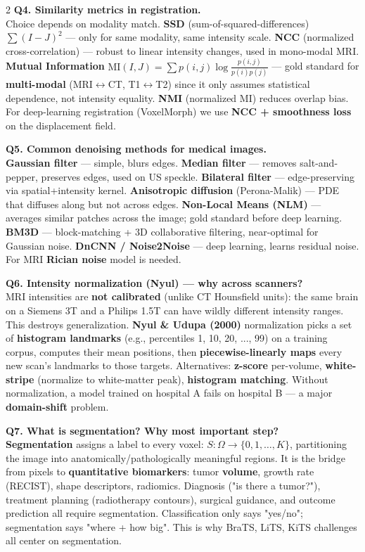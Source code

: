 \begin{paracol}{2}
\textbf{Q4. Similarity metrics in registration.}\\
Choice depends on modality match. \textbf{SSD} (sum-of-squared-differences) $\sum (I-J)^2$ — only for same modality, same intensity scale. \textbf{NCC} (normalized cross-correlation) — robust to linear intensity changes, used in mono-modal MRI. \textbf{Mutual Information} \(\mathrm{MI}(I,J)=\sum p(i,j)\log\frac{p(i,j)}{p(i)p(j)}\) — gold standard for \textbf{multi-modal} (MRI$\leftrightarrow$CT, T1$\leftrightarrow$T2) since it only assumes statistical dependence, not intensity equality. \textbf{NMI} (normalized MI) reduces overlap bias. For deep-learning registration (VoxelMorph) we use \textbf{NCC + smoothness loss} on the displacement field.

\textbf{Q5. Common denoising methods for medical images.}\\
\textbf{Gaussian filter} — simple, blurs edges. \textbf{Median filter} — removes salt-and-pepper, preserves edges, used on US speckle. \textbf{Bilateral filter} — edge-preserving via spatial+intensity kernel. \textbf{Anisotropic diffusion} (Perona-Malik) — PDE that diffuses along but not across edges. \textbf{Non-Local Means (NLM)} — averages similar patches across the image; gold standard before deep learning. \textbf{BM3D} — block-matching + 3D collaborative filtering, near-optimal for Gaussian noise. \textbf{DnCNN / Noise2Noise} — deep learning, learns residual noise. For MRI \textbf{Rician noise} model is needed.

\textbf{Q6. Intensity normalization (Nyul) — why across scanners?}\\
MRI intensities are \textbf{not calibrated} (unlike CT Hounsfield units): the same brain on a Siemens 3T and a Philips 1.5T can have wildly different intensity ranges. This destroys generalization. \textbf{Nyul \& Udupa (2000)} normalization picks a set of \textbf{histogram landmarks} (e.g., percentiles 1, 10, 20, ..., 99) on a training corpus, computes their mean positions, then \textbf{piecewise-linearly maps} every new scan's landmarks to those targets. Alternatives: \textbf{z-score} per-volume, \textbf{white-stripe} (normalize to white-matter peak), \textbf{histogram matching}. Without normalization, a model trained on hospital A fails on hospital B — a major \textbf{domain-shift} problem.

\textbf{Q7. What is segmentation? Why most important step?}\\
\textbf{Segmentation} assigns a label to every voxel: $S:\Omega\to\{0,1,\ldots,K\}$, partitioning the image into anatomically/pathologically meaningful regions. It is the bridge from pixels to \textbf{quantitative biomarkers}: tumor \textbf{volume}, growth rate (RECIST), shape descriptors, radiomics. Diagnosis ("is there a tumor?"), treatment planning (radiotherapy contours), surgical guidance, and outcome prediction all require segmentation. Classification only says "yes/no"; segmentation says "where + how big". This is why BraTS, LiTS, KiTS challenges all center on segmentation.


\end{paracol}
